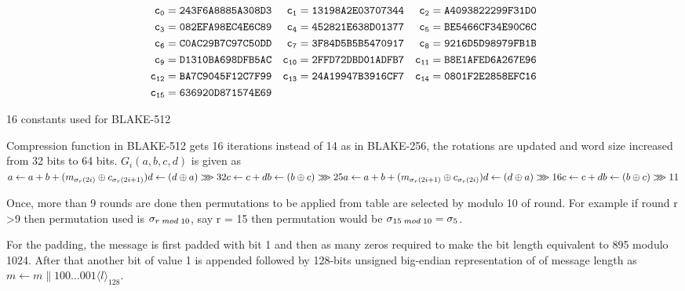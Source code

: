   \begin{table}
    \begin{align*}
         {\tt c_{0}}  &= {\tt 243F6A8885A308D3} & {\tt c_{1}}  &= {\tt 13198A2E03707344} & {\tt c_{2}}  &= {\tt A4093822299F31D0} 
      \\ {\tt c_{3}}  &= {\tt 082EFA98EC4E6C89} & {\tt c_{4}}  &= {\tt 452821E638D01377} & {\tt c_{5}}  &= {\tt BE5466CF34E90C6C} 
      \\ {\tt c_{6}}  &= {\tt C0AC29B7C97C50DD} & {\tt c_{7}}  &= {\tt 3F84D5B5B5470917} & {\tt c_{8}}  &= {\tt 9216D5D98979FB1B} 
      \\ {\tt c_{9}}  &= {\tt D1310BA698DFB5AC} & {\tt c_{10}} &= {\tt 2FFD72DBD01ADFB7} & {\tt c_{11}} &= {\tt B8E1AFED6A267E96} 
      \\ {\tt c_{12}} &= {\tt BA7C9045F12C7F99} & {\tt c_{13}} &= {\tt 24A19947B3916CF7} & {\tt c_{14}} &= {\tt 0801F2E2858EFC16} 
      \\ {\tt c_{15}} &= {\tt 636920D871574E69} &                                        &      
    \end{align*}
    \caption{16 constants used for BLAKE-512 \cite{00002}}
  \end{table}
  
  Compression function in BLAKE-512 gets 16 iterations instead of 14 as in BLAKE-256, the rotations are updated and 
  word size increased from 32 bits to 64 bits. $G_{i}(a, b, c, d)$ is given as \\
  $
  a \gets a + b + (m_{\sigma_{r}(2i)} \oplus c_{\sigma_{r}(2i + 1)}) \\
  d \gets (d \oplus a) \ggg 32 \\
  c \gets c + d \\
  b \gets (b \oplus c) \ggg 25 \\
  a \gets a + b + (m_{\sigma_{r}(2i + 1)} \oplus c_{\sigma_{r}(2i)}) \\
  d \gets (d \oplus a) \ggg 16 \\
  c \gets c + d \\
  b \gets (b \oplus c) \ggg 11
  $
  
  Once, more than 9 rounds are done then permutations to be applied from table are selected by modulo 10 of round. 
  For example if round r \textgreater 9 then permutation used is $\sigma_{r \thickspace mod \thickspace 10}$, say 
  r = 15 then permutation would be $\sigma_{15 \thickspace mod \thickspace 10} = \sigma_{5}$.

  For the padding, the message is first padded with bit 1 and then as many zeros required to make the bit length
  equivalent to 895 modulo 1024. After that another bit of value 1 is appended followed by 128-bits unsigned big-endian
  representation of of message length as $m \gets m \parallel 100 \dots 001 \langle l \rangle_{128}$.

